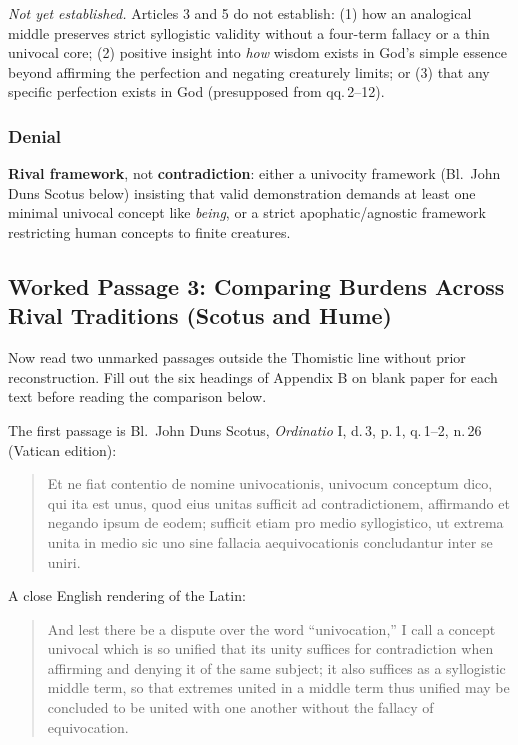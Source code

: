 \emph{Not yet established.} Articles 3 and 5 do not establish: (1) how an analogical middle preserves strict syllogistic validity without a four-term fallacy or a thin univocal core; (2) positive insight into \emph{how} wisdom exists in God's simple essence beyond affirming the perfection and negating creaturely limits; or (3) that any specific perfection exists in God (presupposed from qq.\,2--12).

\subsubsection*{Denial}

\textbf{Rival framework}, not \textbf{contradiction}: either a univocity framework (Bl.\ John Duns Scotus below) insisting that valid demonstration demands at least one minimal univocal concept like \emph{being}, or a strict apophatic/agnostic framework restricting human concepts to finite creatures.

\subsection{Worked Passage 3: Comparing Burdens Across Rival Traditions (Scotus and Hume)}

Now read two unmarked passages outside the Thomistic line without prior reconstruction. Fill out the six headings of Appendix B on blank paper for each text before reading the comparison below.

The first passage is Bl.\ John Duns Scotus, \emph{Ordinatio} I, d.\,3, p.\,1, q.\,1--2, n.\,26 (Vatican edition):

\begin{quote}
Et ne fiat contentio de nomine univocationis, univocum conceptum dico, qui ita est unus, quod eius unitas sufficit ad contradictionem, affirmando et negando ipsum de eodem; sufficit etiam pro medio syllogistico, ut extrema unita in medio sic uno sine fallacia aequivocationis concludantur inter se uniri.
\end{quote}

A close English rendering of the Latin:

\begin{quote}
And lest there be a dispute over the word ``univocation,'' I call a concept univocal which is so unified that its unity suffices for contradiction when affirming and denying it of the same subject; it also suffices as a syllogistic middle term, so that extremes united in a middle term thus unified may be concluded to be united with one another without the fallacy of equivocation.
\end{quote}

